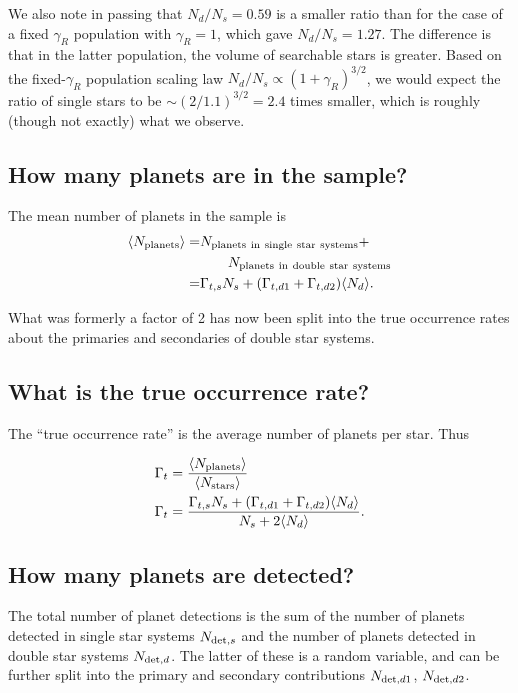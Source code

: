 \documentclass{emulateapj}
\begin{document}
We also note in passing that $N_d/N_s = 0.59$ is a smaller ratio than for the 
case of a fixed $\gamma_R$ population with $\gamma_R = 1$, which gave $N_d/N_s 
= 1.27$. The difference is that in the latter population, the volume of 
searchable stars is greater. Based on the fixed-$\gamma_R$ population scaling 
law $N_d / N_s \propto (1+\gamma_R)^{3/2}$, we 
would expect the ratio of single stars to be $\sim (2/1.1)^{3/2} = 2.4$ 
times smaller, which is roughly (though not exactly) what we observe.



\subsection{How many planets are in the sample?}

The mean number of planets in the sample is
\begin{align}
\langle N_{\rm planets} \rangle
=& N_{\rm planets\ in\ single\ star\ systems}  +  \\
&\quad\quad N_{\rm planets\ in\ double\ star\ systems} 
\nonumber \\
=& \Gamma_{t,s} N_s + (\Gamma_{t,d1} + \Gamma_{t,d2}) \langle N_d \rangle.
\end{align}

What was formerly a factor of 2 has now been split into the true occurrence 
rates about the primaries and secondaries of double star systems.

\subsection{What is the true occurrence rate?}

The ``true occurrence rate'' is the average number of planets per star. Thus

\begin{align}
\Gamma_t &= \frac{\langle N_{\rm planets}\rangle}{\langle N_{\rm stars} 
\rangle} \\
\Gamma_t &= \frac{\Gamma_{t,s} N_s + (\Gamma_{t,d1} + \Gamma_{t,d2}) \langle 
N_d\rangle}{N_s +	2\langle N_d\rangle}.
\label{eq:true_occ_2}
\end{align}



\subsection{How many planets are detected?}

The total number of planet detections is the sum of the number of planets 
detected in single star systems $N_{{\rm det},s}$ and the number of planets 
detected in double star systems $N_{{\rm det},d}$.
The latter of these is a random variable, and can be further split into the 
primary and secondary contributions $N_{{\rm det},d1}$, $N_{{\rm det},d2}$.
\end{document}
